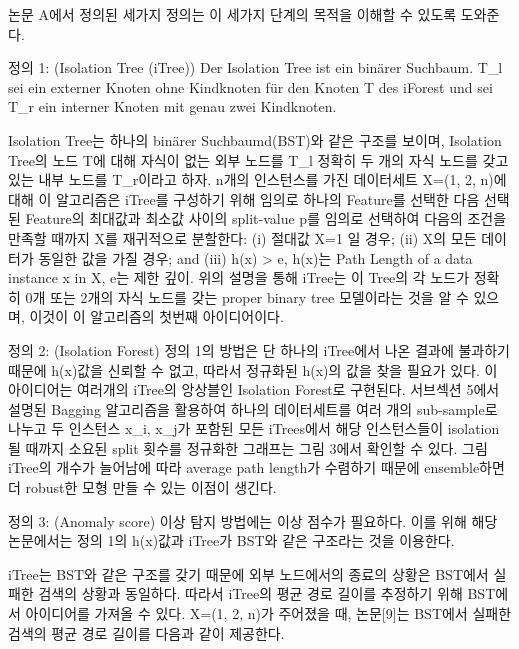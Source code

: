                 논문 A에서 정의된 세가지 정의는 이 세가지 단계의 목적을 이해할 수 있도록 도와준다.

                정의 1: (Isolation Tree (iTree))
                    Der Isolation Tree ist ein binärer Suchbaum. T_l sei ein externer Knoten ohne Kindknoten für den Knoten T des iForest und sei T_r ein interner Knoten mit genau zwei Kindknoten.

                    Isolation Tree는 하나의 binärer Suchbaumd(BST)와 같은 구조를 보이며, Isolation Tree의 노드 T에 대해 자식이 없는 외부 노드를 T_l 정확히 두 개의 자식 노드를 갖고 있는 내부 노드를 T_r이라고 하자. n개의 인스턴스를 가진 데이터세트 X=(1, 2, n)에 대해 이 알고리즘은 iTree를 구성하기 위해 임의로 하나의 Feature를 선택한 다음 선택된 Feature의 최대값과 최소값 사이의 split-value p를 임의로 선택하여 다음의 조건을 만족할 때까지 X를 재귀적으로 분할한다: (i) 절대값 X=1 일 경우; (ii) X의 모든 데이터가 동일한 값을 가질 경우; and (iii) h(x) > e, h(x)는 Path Length of a data instance x in X, e는 제한 깊이. 위의 설명을 통해 iTree는 이 Tree의 각 노드가 정확히 0개 또는 2개의 자식 노드를 갖는 proper binary tree 모델이라는 것을 알 수 있으며, 이것이 이 알고리즘의 첫번째 아이디어이다.

                정의 2: (Isolation Forest)
                    정의 1의 방법은 단 하나의 iTree에서 나온 결과에 불과하기 때문에 h(x)값을 신뢰할 수 없고, 따라서 정규화된 h(x)의 값을 찾을 필요가 있다. 이 아이디어는 여러개의 iTree의 앙상블인 Isolation Forest로 구현된다. 서브섹션 5에서 설명된 Bagging 알고리즘을 활용하여 하나의 데이터세트를 여러 개의 sub-sample로 나누고 두 인스턴스 x_i, x_j가 포함된 모든 iTrees에서 해당 인스턴스들이 isolation될 때까지 소요된 split 횟수를 정규화한 그래프는 그림 3에서 확인할 수 있다.
                    그림 \cite{Liu08}
                    iTree의 개수가 늘어남에 따라 average path length가 수렴하기 때문에 ensemble하면 더 robust한 모형 만들 수 있는 이점이 생긴다.

                정의 3: (Anomaly score)
                    이상 탐지 방법에는 이상 점수가 필요하다. 이를 위해 해당 논문에서는 정의 1의 h(x)값과 iTree가 BST와 같은 구조라는 것을 이용한다.
                    
                    iTree는 BST와 같은 구조를 갖기 때문에 외부 노드에서의 종료의 상황은 BST에서 실패한 검색의 상황과 동일하다. 따라서 iTree의 평균 경로 길이를 추정하기 위해 BST에서 아이디어를 가져올 수 있다. X=(1, 2, n)가 주어졌을 때, 논문[9]는 BST에서 실패한 검색의 평균 경로 길이를 다음과 같이 제공한다.
                    
